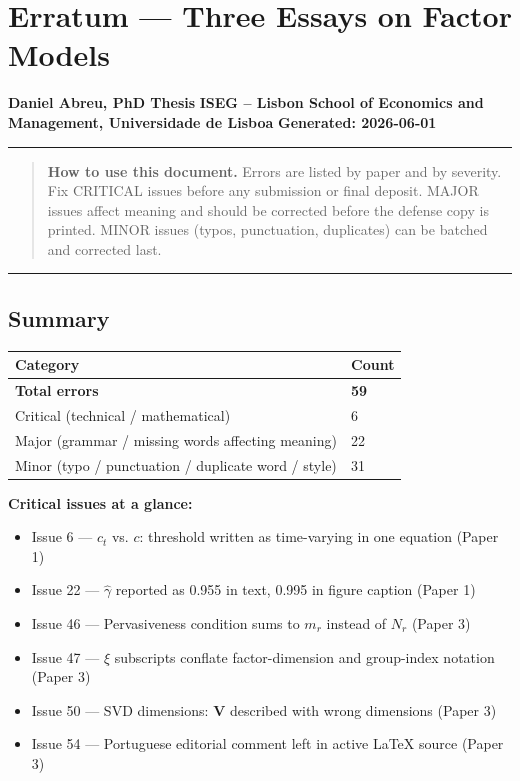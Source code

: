\documentclass[11pt,a4paper]{article}
\begin{document}
\section*{Erratum — Three Essays on Factor Models}

\textbf{Daniel Abreu, PhD Thesis}  
\textbf{ISEG – Lisbon School of Economics and Management, Universidade de Lisboa}  
\textbf{Generated: 2026-06-01}

\medskip\hrule\medskip

\begin{quote}
\textbf{How to use this document.} Errors are listed by paper and by severity. Fix CRITICAL issues before any submission or final deposit. MAJOR issues affect meaning and should be corrected before the defense copy is printed. MINOR issues (typos, punctuation, duplicates) can be batched and corrected last.
\end{quote}

\medskip\hrule\medskip

\subsection*{Summary}

\begin{longtable}{p{5cm} p{8cm}}
\toprule
\textbf{Category} & \textbf{Count} \\
\midrule
\endhead
\textbf{Total errors} & \textbf{59} \\
Critical (technical / mathematical) & 6 \\
Major (grammar / missing words affecting meaning) & 22 \\
Minor (typo / punctuation / duplicate word / style) & 31 \\
\bottomrule
\end{longtable}


\textbf{Critical issues at a glance:}
\begin{itemize}
\item Issue 6 — $c_t$ vs. $c$: threshold written as time-varying in one equation (Paper 1)
\item Issue 22 — $\hat{\gamma}$ reported as 0.955 in text, 0.995 in figure caption (Paper 1)
\item Issue 46 — Pervasiveness condition sums to $m_r$ instead of $N_r$ (Paper 3)
\item Issue 47 — $\xi$ subscripts conflate factor-dimension and group-index notation (Paper 3)
\item Issue 50 — SVD dimensions: $\mathbf{V}$ described with wrong dimensions (Paper 3)
\item Issue 54 — Portuguese editorial comment left in active LaTeX source (Paper 3)
\end{itemize}
\end{document}

